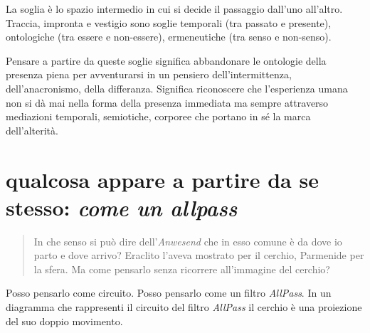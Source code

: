 \documentclass{../../lib/gs}
\begin{document}

La soglia è lo spazio intermedio in cui si decide il passaggio dall'uno all'altro. Traccia, impronta e vestigio sono soglie temporali (tra passato e presente), ontologiche (tra essere e non-essere), ermeneutiche (tra senso e non-senso).

Pensare a partire da queste soglie significa abbandonare le ontologie della presenza piena per avventurarsi in un pensiero dell'intermittenza, dell'anacronismo, della differanza. Significa riconoscere che l'esperienza umana non si dà mai nella forma della presenza immediata ma sempre attraverso mediazioni temporali, semiotiche, corporee che portano in sé la marca dell'alterità.

\clearpage


\section{qualcosa appare a partire da se stesso: \emph{come un allpass}}

\begin{quote}
  \begin{sf}
    \small
    In che senso si può dire dell'\emph{Anwesend} che in esso comune è da dove
    io parto e dove arrivo? Eraclito l'aveva mostrato per il cerchio, Parmenide
    per la sfera. Ma come pensarlo senza ricorrere all'immagine del cerchio?
  \end{sf}
\end{quote}

Posso pensarlo come circuito. Posso pensarlo come un filtro \emph{AllPass}. In
un diagramma che rappresenti il circuito del filtro \emph{AllPass} il cerchio è
una proiezione del suo doppio movimento.

\begin{figure}[ht]
  \centering
  \label{tikz:ciclobase}
\end{figure}
\end{document}
